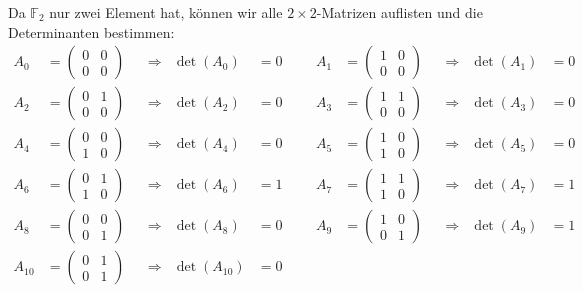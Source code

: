 \begin{beispiel}
Da $\mathbb F_2$ nur zwei Element hat, können wir alle $2\times 2$-Matrizen
auflisten und die Determinanten bestimmen:
\begin{equation}
\begin{aligned}
A_0   &=\begin{pmatrix}0&0\\0&0\end{pmatrix} &&\Rightarrow&\det(A_0   )&=0&&&
A_1   &=\begin{pmatrix}1&0\\0&0\end{pmatrix} &&\Rightarrow&\det(A_1   )&=0\\
A_2   &=\begin{pmatrix}0&1\\0&0\end{pmatrix} &&\Rightarrow&\det(A_2   )&=0&&&
A_3   &=\begin{pmatrix}1&1\\0&0\end{pmatrix} &&\Rightarrow&\det(A_3   )&=0\\
A_4   &=\begin{pmatrix}0&0\\1&0\end{pmatrix} &&\Rightarrow&\det(A_4   )&=0&&&
A_5   &=\begin{pmatrix}1&0\\1&0\end{pmatrix} &&\Rightarrow&\det(A_5   )&=0\\
A_6   &=\begin{pmatrix}0&1\\1&0\end{pmatrix} &&\Rightarrow&\det(A_6   )&=1&&&
A_7   &=\begin{pmatrix}1&1\\1&0\end{pmatrix} &&\Rightarrow&\det(A_7   )&=1\\
A_8   &=\begin{pmatrix}0&0\\0&1\end{pmatrix} &&\Rightarrow&\det(A_8   )&=0&&&
A_9   &=\begin{pmatrix}1&0\\0&1\end{pmatrix} &&\Rightarrow&\det(A_9   )&=1\\
A_{10}&=\begin{pmatrix}0&1\\0&1\end{pmatrix} &&\Rightarrow&\det(A_{10})&=0&&&

\end{aligned}
\end{equation}
\end{beispiel}
